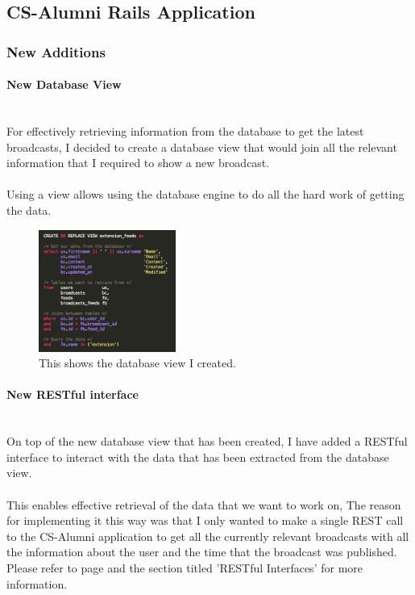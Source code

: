 \documentclass{article}
\newcommand{\myparagraph}[1]{\paragraph{#1}\mbox{}\\}
\begin{document}
\subsection{CS-Alumni Rails Application}

\subsubsection{New Additions}

\myparagraph{New Database View}
For effectively retrieving information from the database to get the latest broadcasts, I decided to create a database view that would join all the relevant information that I required to show a new broadcast.\\
\\
Using a view allows using the database engine to do all the hard work of getting the data.

\begin{figure}[H]
\centering
\includegraphics[width=0.4\textwidth]{sqlview}
\caption{This shows the database view I created.}
\end{figure}

\myparagraph{New RESTful interface}
On top of the new database view that has been created, I have added a RESTful interface to interact with the data that has been extracted from the database view. \\
\\
This enables effective retrieval of the data that we want to work on, The reason for implementing it this way was that I only wanted to make a single REST call to the CS-Alumni application to get all the currently relevant broadcasts with all the information about the user and the time that the broadcast was published.
\\ 
Please refer to page \pageref{sec:technology} and the section titled 'RESTful Interfaces' for more information.
\end{document}
